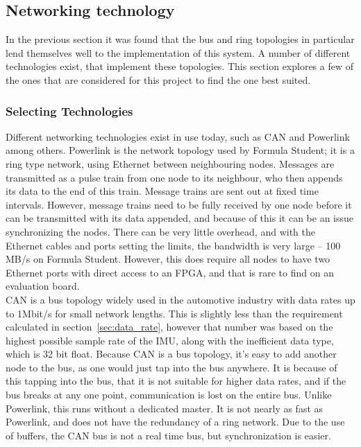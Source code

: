 \subsection{Networking technology}
In the previous section it was found that the bus and ring topologies in particular lend themselves well to the implementation of this system.
A number of different technologies exist, that implement these topologies. 
This section explores a few of the ones that are considered for this project to find the one best suited.

\subsubsection*{Selecting Technologies}
Different networking technologies exist in use today, such as CAN and Powerlink among others.
Powerlink is the network topology used by Formula Student; it is a ring type network, using Ethernet between neighbouring nodes.
Messages are transmitted as a pulse train from one node to its neighbour, who then appends its data to the end of this train. 
Message trains are sent out at fixed time intervals.
However, message trains need to be fully received by one node before it can be transmitted with its data appended, and because of this it can be an issue synchronizing the nodes.
There can be very little overhead, and with the Ethernet cables and ports setting the limits, the bandwidth is very large -- 100 MB/s on Formula Student.
However, this does require all nodes to have two Ethernet ports with direct access to an FPGA, and that is rare to find on an evaluation board.\\

CAN is a bus topology widely used in the automotive industry with data rates up to 1Mbit/s for small network lengths.
This is slightly less than the requirement calculated in section~\ref{sec:data_rate}, however that number was based on the highest possible sample rate of the IMU, along with the inefficient data type, which is 32 bit float.
Because CAN is a bus topology, it's easy to add another node to the bus, as one would just tap into the bus anywhere.
It is because of this tapping into the bus, that it is not suitable for higher data rates, and if the bus breaks at any one point, communication is lost on the entire bus.
Unlike Powerlink, this runs without a dedicated master.
It is not nearly as fast as Powerlink, and does not have the redundancy of a ring network.
Due to the use of buffers, the CAN bus is not a real time bus, but synchronization is easier.\\

